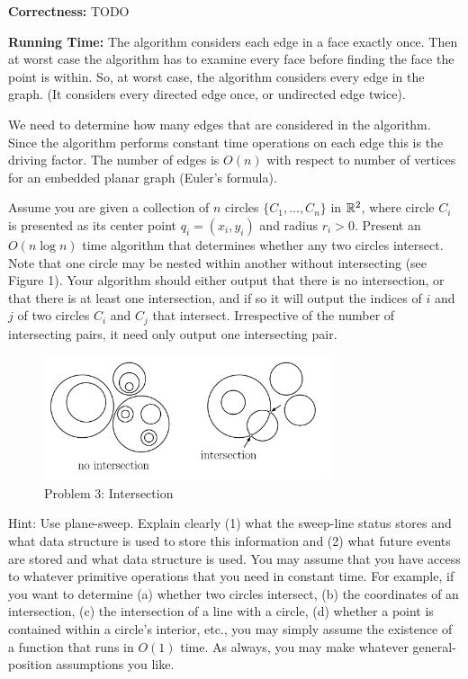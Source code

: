 \documentclass[11pt]{article}
\begin{document}
\textbf{Correctness: } TODO

\textbf{Running Time: } 
The algorithm considers each edge in a face exactly once. Then at worst case the algorithm has to examine
every face before finding the face the point is within. So, at worst case, the algorithm considers every edge in the graph.
(It considers every directed edge once, or undirected edge twice).

We need to determine how many edges that are considered in the algorithm.
Since the algorithm performs constant time operations on each edge this is the driving factor.
The number of edges is $O(n)$ with respect to number of vertices for an embedded planar graph (Euler's formula).


Assume you are given a collection of $n$ circles $\{C_1 , \ldots , C_n \}$ in
$\mathbb{R}^2$, where circle $C_i$ is presented as its center point $q_i = (x_i, y_i)$
and radius $r_i > 0$. Present an $O(n \log n)$ time algorithm that determines
whether any two circles intersect. Note that one circle may be nested within
another without intersecting (see Figure 1). Your algorithm should either output
that there is no intersection, or that there is at least one intersection, and
if so it will output the indices of $i$ and $j$ of two circles $C_i$ and $C_j$
that intersect. Irrespective of the number of intersecting pairs, it need only
output one intersecting pair.

\begin{figure}[h]
    \centering
    \includegraphics[width=0.75\textwidth]{intersection}
    \caption{Problem 3: Intersection}
\end{figure}

Hint: Use plane-sweep. Explain clearly (1) what the sweep-line status stores and
what data structure is used to store this information and (2) what future events
are stored and what data structure is used. You may assume that you have access
to whatever primitive operations that you need in constant time. For example, if
you want to determine (a) whether two circles intersect, (b) the coordinates of
an intersection, (c) the intersection of a line with a circle, (d) whether a
point is contained within a circle's interior, etc., you may simply assume the
existence of a function that runs in $O(1)$ time. As always, you may make
whatever general-position assumptions you like.
\end{document}
